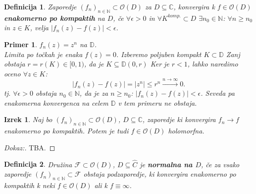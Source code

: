 \documentclass{article}
\newtheorem{definicija}{Definicija}
\newtheorem{primer}{Primer}
\newtheorem{izrek}{Izrek}
\newcommand{\C}{\mathbb{C}}
\newcommand{\D}{\mathbb{D}}
\newcommand{\N}{\mathbb{N}}
\newcommand{\F}{\mathcal{F}}
\newcommand{\Ho}{\mathcal{O}}
\begin{document}
\begin{definicija}
Zaporedje $(f_n)_{n\in\N} \subset \Ho(D)$ za $D \subseteq \C$, konvergira k $f \in \Ho(D)$ \textbf{enakomerno po kompaktih} na $D$, če $\forall \epsilon > 0$ in $\forall K^{komp.} \subset D$ $\exists n_0\in \N$: $\forall n \geq n_0$ in $z\in K$, velja $|f_n(z) - f(z)| < \epsilon$.
\end{definicija}

\begin{primer}
$f_n(z) = z^n$ na $\D$.\\ 
Limita po točkah je enaka $f(z) = 0$. Izberemo poljuben kompakt $K\subset \D$ Zanj obstaja $r = r(K) \in [0, 1)$, da je $K \subseteq \D(0, r)$ Ker je $r < 1$, lahko naredimo oceno $\forall z\in K$:
$$
|f_n(z) - f(z)| = |z^n| \leq r^n \xrightarrow{n\rightarrow \infty} 0.
$$
tj. $\forall \epsilon > 0$ obstaja $n_0 \in \N$, da je za $n \geq n_0$: $|f_n(z) - f(z)| < \epsilon$. Seveda pa enakomerna konvergenca na celem $\D$ v tem primeru ne obstaja.
\end{primer}

\begin{izrek}
Naj bo $(f_n)_{n\in\N} \subset \Ho(D)$, $D\subseteq \C$, zaporedje ki konvergira $f_n \rightarrow f$ enakomerno po kompaktih. Potem je tudi $f \in \Ho(D)$ holomorfna.
\end{izrek}

\begin{proof}[Dokaz:]
TBA.
\end{proof}

\begin{definicija}
Družina $\F \subset \Ho(D)$, $D \subseteq \hat{C}$ je \textbf{normalna na $D$}, če za vsako zaporedje $(f_n)_{n\in \N} \subset \F$ obstaja podzaporedje, ki konvergira enakomerno po kompaktih k neki $f\in \Ho(D)$ ali k $f\equiv \infty$.
\end{definicija}
\end{document}
